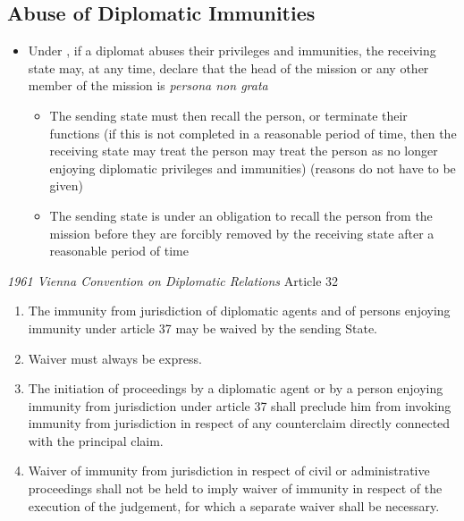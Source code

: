 \subsection{Abuse of Diplomatic Immunities}
\begin{itemize}
    \item Under , if a diplomat abuses their privileges and immunities, the receiving state may, at any time, declare that the head of the mission or any other member of the mission is \textit{persona non grata}
    \begin{itemize}
        \item The sending state must then recall the person, or terminate their functions (if this is not completed in a reasonable period of time, then the receiving state may treat the person may treat the person as no longer enjoying diplomatic privileges and immunities) (reasons do not have to be given)
        \item The sending state is under an obligation to recall the person from the mission before they are forcibly removed by the receiving state after a reasonable period of time
    \end{itemize}
\end{itemize}

\begin{conventiondetails}{\textit{1961 Vienna Convention on Diplomatic Relations} Article 32}
    \flushleft
    \begin{enumerate}
        \item The immunity from jurisdiction of diplomatic agents and of persons enjoying immunity under article 37 may be waived by the sending State.
        \item Waiver must always be express.
        \item The initiation of proceedings by a diplomatic agent or by a person enjoying immunity from jurisdiction under article 37 shall preclude him from invoking immunity from jurisdiction in respect of any counterclaim directly connected with the principal claim.
        \item Waiver of immunity from jurisdiction in respect of civil or administrative proceedings shall not be held to imply waiver of immunity in respect of the execution of the judgement, for which a separate waiver shall be necessary.
    \end{enumerate}
\end{conventiondetails}

